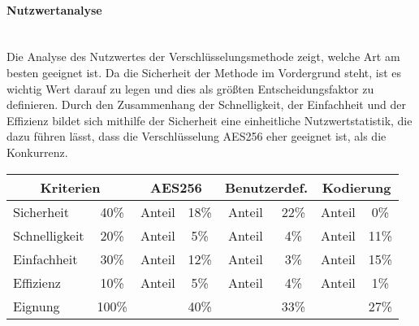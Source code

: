 \begin{indentE}
	\paragraph{Nutzwertanalyse}\mbox{}\\
	Die Analyse des Nutzwertes der Verschlüsselungsmethode zeigt, welche Art am besten geeignet ist. Da die Sicherheit der Methode im Vordergrund steht, ist es wichtig Wert darauf zu legen und dies als größten Entscheidungsfaktor zu definieren. Durch den Zusammenhang der Schnelligkeit, der Einfachheit und der Effizienz bildet sich mithilfe der Sicherheit eine einheitliche Nutzwertstatistik, die dazu führen lässt, dass die Verschlüsselung AES256 eher geeignet ist, als die Konkurrenz.
	\begin{table}[H]
		\begin{center}
			\begin{tabularx} {\linewidth}{|X|c|c|c|c|c|c|c|}
				\hline
				\multicolumn{2}{|c|}{\textbf{Kriterien}} & 
				\multicolumn{2}{c|}{\textbf{AES256}} &
				\multicolumn{2}{c|}{\textbf{Benutzerdef.}} & 
				\multicolumn{2}{c|}{\textbf{Kodierung}} \\
				\hline
				Sicherheit & 40\% & Anteil & 18\% & Anteil & 22\% & Anteil & 0\% \\
				\hline
				Schnelligkeit & 20\% & Anteil & 5\% & Anteil & 4\% & Anteil & 11\% \\
				\hline
				Einfachheit & 30\% & Anteil & 12\% & Anteil & 3\% & Anteil & 15\% \\
				\hline
				Effizienz & 10\% & Anteil & 5\% & Anteil & 4\% & Anteil & 1\% \\
				\hline
				Eignung & 100\% &  & 40\% &  & 33\% &  & 27\% \\
				\cline{1-2}\cline{4-4}\cline{6-6}\cline{8-8}
			\end{tabularx}
		\end{center}
	\end{table}
\end{indentE}

